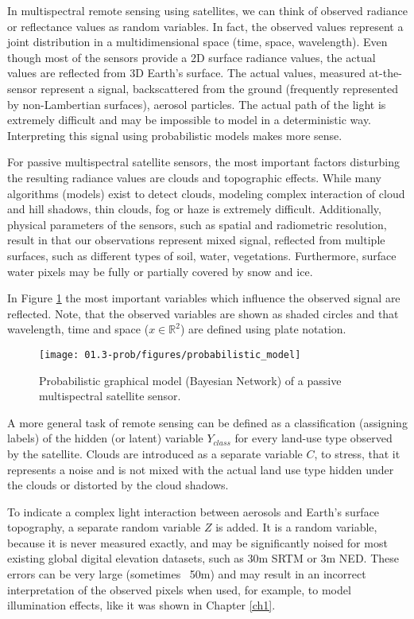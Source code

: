 In multispectral remote sensing using satellites, we can think of observed radiance or reflectance values as random variables. In fact, the observed values represent a joint distribution in a multidimensional space (time, space, wavelength). Even though most of the sensors provide a 2D surface radiance values, the actual values are reflected from 3D Earth's surface. The actual values, measured at-the-sensor represent a signal, backscattered from the ground (frequently represented by non-Lambertian surfaces), aerosol particles. The actual path of the light is extremely difficult and may be impossible to model in a deterministic way. Interpreting this signal using probabilistic models makes more sense.

For passive multispectral satellite sensors, the most important factors disturbing the resulting radiance values are clouds and topographic effects. While many algorithms (models) exist to detect clouds, modeling complex interaction of cloud and hill shadows, thin clouds, fog or haze is extremely difficult. Additionally, physical parameters of the sensors, such as spatial and radiometric resolution, result in that our observations represent mixed signal, reflected from multiple surfaces, such as different types of soil, water, vegetations. Furthermore, surface water pixels may be fully or partially covered by snow and ice.

In Figure \ref{fig:pgm} the most important variables which influence the observed signal are reflected. Note, that the observed variables are shown as shaded circles and that wavelength, time and space ($x \in \mathbb{R}^2$) are defined using plate notation.

\begin{figure}
	\centering
	\texttt{[image: 01.3-prob/figures/probabilistic\_model]} 
	\caption{Probabilistic graphical model (Bayesian Network) of a passive multispectral satellite sensor.}
	\label{fig:pgm}
\end{figure}

A more general task of remote sensing can be defined as a classification (assigning labels) of the hidden (or latent) variable $Y_{class}$ for every land-use type observed by the satellite. Clouds are introduced as a separate variable $C$, to stress, that it represents a noise and is not mixed with the actual land use type hidden under the clouds or distorted by the cloud shadows. 

To indicate a complex light interaction between aerosols and Earth's surface topography, a separate random variable $Z$ is added. It is a random variable, because it is never measured exactly, and may be significantly noised for most existing global digital elevation datasets, such as 30m SRTM or 3m NED. These errors can be very large (sometimes ~50m) and may result in an incorrect interpretation of the observed pixels when used, for example, to model illumination effects, like it was shown in Chapter \ref{ch1}.

